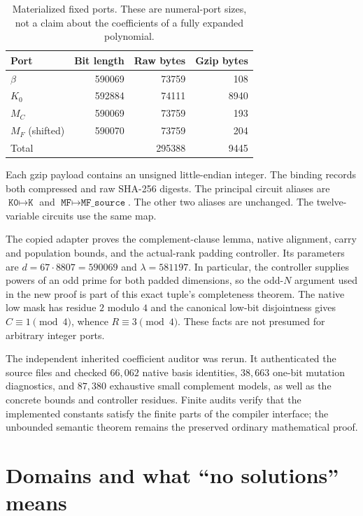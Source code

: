 \documentclass[11pt,a4paper]{article}
\theoremstyle{remark}
\begin{document}
\begin{table}[htbp]
\centering
\begin{tabular}{@{}lrrr@{}}
\toprule
Port & Bit length & Raw bytes & Gzip bytes\\
\midrule
$\beta$ & 590069 & 73759 & 108\\
$K_0$ & 592884 & 74111 & 8940\\
$M_C$ & 590069 & 73759 & 193\\
$M_F$ (shifted) & 590070 & 73759 & 204\\
\midrule
Total & & 295388 & 9445\\
\bottomrule
\end{tabular}
\caption{Materialized fixed ports. These are numeral-port sizes, not a
claim about the coefficients of a fully expanded polynomial.}
\end{table}

Each gzip payload contains an unsigned little-endian integer. The binding
records both compressed and raw SHA-256 digests. The principal circuit
aliases are $\texttt{K0}\mapsto\texttt{K}$ and
$\texttt{MF}\mapsto\texttt{MF\_source}$. The other two aliases are unchanged.
The twelve-variable circuits use the same map.

The copied adapter proves the complement-clause lemma, native alignment,
carry and population bounds, and the actual-rank padding controller. Its
parameters are $d=67\cdot8807=590069$ and $\lambda=581197$. In particular,
the controller supplies powers of an odd prime for both padded dimensions,
so the odd-$N$ argument used in the new proof is part of this exact tuple's
completeness theorem. The native low mask has residue $2$ modulo $4$ and
the canonical low-bit disjointness gives $C\equiv1\pmod4$, whence
$R\equiv3\pmod4$. These facts are not presumed for arbitrary integer ports.

The independent inherited coefficient auditor was rerun. It authenticated
the source files and checked $66{,}062$ native basis identities,
$38{,}663$ one-bit mutation diagnostics, and $87{,}380$ exhaustive small
complement models, as well as the concrete bounds and controller residues.
Finite audits verify that the implemented constants satisfy the finite
parts of the compiler interface; the unbounded semantic theorem remains
the preserved ordinary mathematical proof.

\section{Domains and what ``no solutions'' means}
\label{sec:domains}
\end{document}
